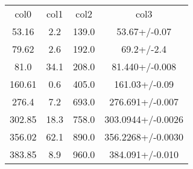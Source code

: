 \begin{table}
\begin{tabular}{cccc}
col0 & col1 & col2 & col3 \\
53.16 & 2.2 & 139.0 & 53.67+/-0.07 \\
79.62 & 2.6 & 192.0 & 69.2+/-2.4 \\
81.0 & 34.1 & 208.0 & 81.440+/-0.008 \\
160.61 & 0.6 & 405.0 & 161.03+/-0.09 \\
276.4 & 7.2 & 693.0 & 276.691+/-0.007 \\
302.85 & 18.3 & 758.0 & 303.0944+/-0.0026 \\
356.02 & 62.1 & 890.0 & 356.2268+/-0.0030 \\
383.85 & 8.9 & 960.0 & 384.091+/-0.010 \\
\end{tabular}
\end{table}
